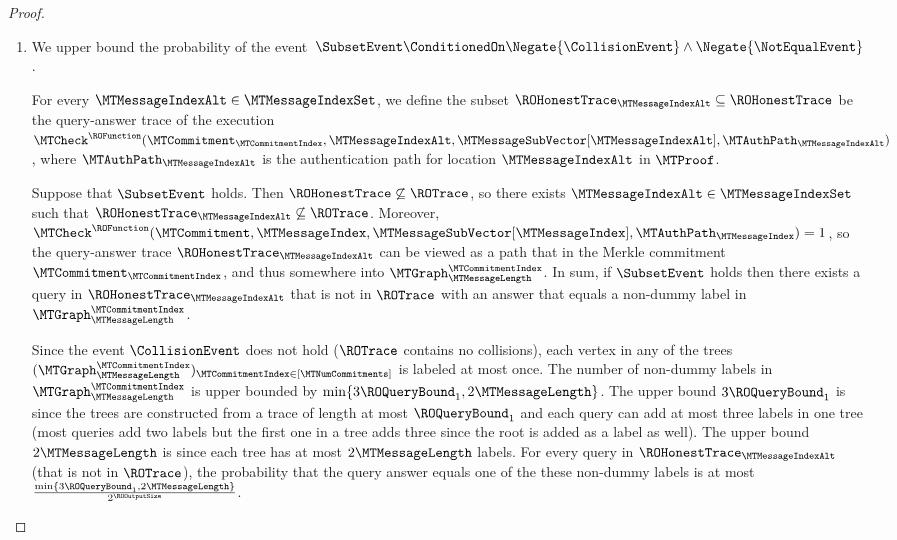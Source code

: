 \begin{proof}
\begin{enumerate}
Summing over all $\ROQueryBound_{1}$ queries in $\ROTrace$,
\begin{align*}
\Pr\left[\NotEqualEventB \ConditionedOn \Negate{\CollisionEvent}\right]
\leq
\sum_{j=1}^{\ROQueryBound_{1}} \frac{\min\{2(j-1) + \MTNumCommitments-1,(\MTNumCommitments-1) \cdot 2\MTMessageLength\}}{2^{\ROOutputSize}}
\leq \ROQueryBound_{1} \cdot \frac{\min\{\ROQueryBound_{1} + \MTNumCommitments-2,(\MTNumCommitments-1) \cdot 2\MTMessageLength\} }{2^{\ROOutputSize}}
\enspace.
\end{align*}

  \item We upper bound the probability of the event $\left.\SubsetEvent \ConditionedOn \Negate{\CollisionEvent} \land \Negate{\NotEqualEvent}  \right.$.

For every $\MTMessageIndexAlt \in \MTMessageIndexSet$, we define the subset $\ROHonestTrace_{\MTMessageIndexAlt} \subseteq \ROHonestTrace$ be the query-answer trace of the execution $\MTCheck^{\ROFunction}(\MTCommitment_{\MTCommitmentIndex},\MTMessageIndexAlt,\MTMessageSubVector[\MTMessageIndexAlt],\MTAuthPath_{\MTMessageIndexAlt})$, where $\MTAuthPath_{\MTMessageIndexAlt}$ is the authentication path for location $\MTMessageIndexAlt$ in $\MTProof$.

Suppose that $\SubsetEvent$ holds. Then $\ROHonestTrace \not \subseteq \ROTrace$, so there exists $\MTMessageIndexAlt \in \MTMessageIndexSet$ such that $\ROHonestTrace_{\MTMessageIndexAlt} \not \subseteq \ROTrace$. Moreover, $\MTCheck^{\ROFunction}(\MTCommitment,\MTMessageIndex,\MTMessageSubVector[\MTMessageIndex],\MTAuthPath_{\MTMessageIndex})=1$, so the query-answer trace $\ROHonestTrace_{\MTMessageIndexAlt}$ can be viewed as a path that  in the Merkle commitment $\MTCommitment_{\MTCommitmentIndex}$, and thus  somewhere into $\MTGraph_{\MTMessageLength}^{\MTCommitmentIndex}$. In sum, if $\SubsetEvent$ holds then there exists a query in $\ROHonestTrace_{\MTMessageIndexAlt}$ that is not in $\ROTrace$ with an answer that equals a non-dummy label in $\MTGraph_{\MTMessageLength}^{\MTCommitmentIndex}$.

Since the event $\CollisionEvent$ does not hold ($\ROTrace$ contains no collisions), each vertex in any of the trees $(\MTGraph_{\MTMessageLength}^{\MTCommitmentIndex})_{\MTCommitmentIndex \in [\MTNumCommitments]}$ is labeled at most once. The number of non-dummy labels in $\MTGraph_{\MTMessageLength}^{\MTCommitmentIndex}$ is upper bounded by $\min\{3\ROQueryBound_{1},2\MTMessageLength\}$. The upper bound $3\ROQueryBound_{1}$ is since the trees are constructed from a trace of length at most $\ROQueryBound_{1}$ and each query can add at most three labels in one tree (most queries add two labels but the first one in a tree adds three since the root is added as a label as well). The upper bound $2\MTMessageLength$ is since each tree has at most $2\MTMessageLength$ labels. For every query in $\ROHonestTrace_{\MTMessageIndexAlt}$ (that is not in $\ROTrace$), the probability that the query answer equals one of the these non-dummy labels is at most $\frac{\min\{3\ROQueryBound_{1},2\MTMessageLength\}}{2^{\ROOutputSize}}$.


\end{enumerate}
\end{proof}
